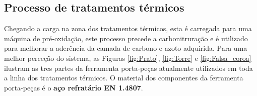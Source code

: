 \subsection{Processo de tratamentos térmicos} \label{ssec:materiais_CS_carbonitruracao}
Chegando a carga na zona dos tratamentos térmicos, esta é carregada para uma máquina de pré-oxidação, este processo precede a carbonitruração e é utilizado para melhorar a aderência da camada de carbono e azoto adquirida. Para uma melhor perceção do sistema, as Figuras \ref{fig:Prato}, \ref{fig:Torre} e \ref{fig:Falsa_coroa} ilustram as tres partes da ferramenta porta-peças atualmente utilizados em toda a linha dos tratamentos térmicos. O material dos componentes da ferramenta porta-peças é o \textbf{aço refratário EN 1.4807}.

